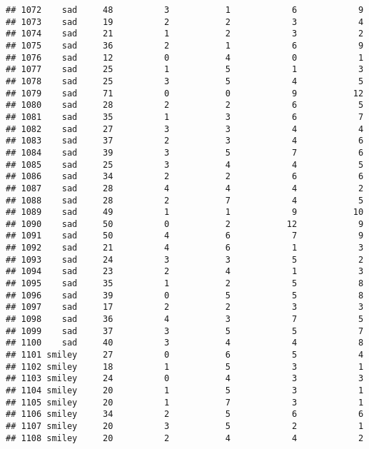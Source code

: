 \documentclass[
]{article}
\begin{document}
\begin{verbatim}
## 1072    sad     48          3           1            6            9
## 1073    sad     19          2           2            3            4
## 1074    sad     21          1           2            3            2
## 1075    sad     36          2           1            6            9
## 1076    sad     12          0           4            0            1
## 1077    sad     25          1           5            1            3
## 1078    sad     25          3           5            4            5
## 1079    sad     71          0           0            9           12
## 1080    sad     28          2           2            6            5
## 1081    sad     35          1           3            6            7
## 1082    sad     27          3           3            4            4
## 1083    sad     37          2           3            4            6
## 1084    sad     39          3           5            7            6
## 1085    sad     25          3           4            4            5
## 1086    sad     34          2           2            6            6
## 1087    sad     28          4           4            4            2
## 1088    sad     28          2           7            4            5
## 1089    sad     49          1           1            9           10
## 1090    sad     50          0           2           12            9
## 1091    sad     50          4           6            7            9
## 1092    sad     21          4           6            1            3
## 1093    sad     24          3           3            5            2
## 1094    sad     23          2           4            1            3
## 1095    sad     35          1           2            5            8
## 1096    sad     39          0           5            5            8
## 1097    sad     17          2           2            3            3
## 1098    sad     36          4           3            7            5
## 1099    sad     37          3           5            5            7
## 1100    sad     40          3           4            4            8
## 1101 smiley     27          0           6            5            4
## 1102 smiley     18          1           5            3            1
## 1103 smiley     24          0           4            3            3
## 1104 smiley     20          1           5            3            1
## 1105 smiley     20          1           7            3            1
## 1106 smiley     34          2           5            6            6
## 1107 smiley     20          3           5            2            1
## 1108 smiley     20          2           4            4            2

\end{verbatim}
\end{document}
